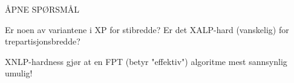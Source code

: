 \begin{tcolorbox}[colback=PosterAccent!6!white,colframe=PosterAccent!6!white,
  boxrule=0pt,arc=1.5\PosterUnit,
  left=7\PosterUnit,right=7\PosterUnit,
  top=5\PosterUnit,bottom=5\PosterUnit,boxsep=0pt,
  before skip=0pt,after skip=0pt]
  {\PosterLabelFont\color{PosterAccent}ÅPNE SPØRSMÅL\par}
  Er noen av variantene i XP for stibredde? 
  Er det XALP-hard (vanskelig) for trepartisjonsbredde? 
  \PosterPara
  {\PosterSmallFont\color{PosterMuted}
    XNLP-hardness gjør at en FPT (betyr "effektiv") 
    algoritme mest sannsynlig umulig!
    \par}
\end{tcolorbox}
